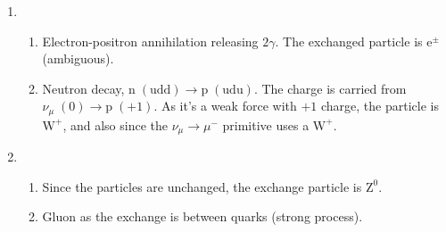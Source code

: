 \documentclass{homework}
\begin{document}
\begin{enumerate}
\begin{align*}
			E_{\bar{\nu}} & = \frac{\left( E_\pi \right)^2 - \left( m_\mu c^2 \right)^2}{2 E_\pi}
			\intertext{Using the energies given in the book (and since the pion energy is its rest mass here),}
			E_{\bar{\nu}} & = \frac{\left(\SI{139.5}{\MeV}\right)^2 - \left(\SI{105.7}{\MeV}\right)^2}
			{2 \left(\SI{139.5}{\MeV}\right)} \\
			& \approx \SI{29.71}{\MeV}
		\end{align*}
		\item[30.] \begin{enumerate}
			\item Electron-positron annihilation releasing $2\gamma$. The exchanged particle is $\mathrm{e}^\pm$ (ambiguous).
			\item Neutron decay, $\mathrm{n}\;(\mathrm{udd}) \to \mathrm{p}\;(\mathrm{udu})$. The charge is carried from $\nu_\mu\;(0) \to \mathrm{p}\;(+1)$. As it's a weak force with $+1$ charge, the particle is $\mathrm{W}^+$, and also since the $\nu_\mu \to \mu^-$ primitive uses a $\mathrm{W}^+$.
		\end{enumerate}
		\item[31.] \begin{enumerate}
			\item Since the particles are unchanged, the exchange particle is $\mathrm{Z}^0$.
			\item Gluon as the exchange is between quarks (strong process).
		\end{enumerate}
	\end{enumerate}
\end{document}
